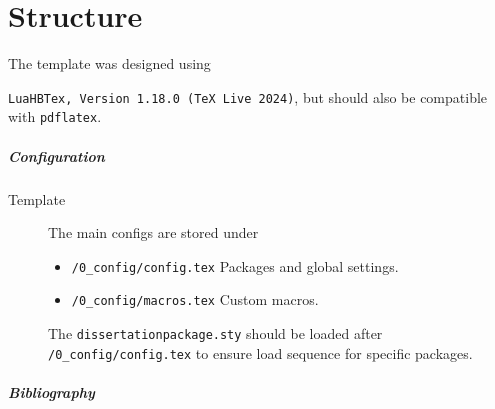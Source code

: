 

\cleardoublepage
\chapter{Structure}

The template was designed using 

\lstinline{LuaHBTex, Version 1.18.0 (TeX Live 2024)}, but should also be compatible with \lstinline{pdflatex}. 


\paragraph{Configuration}

\begin{description}
	\item[Template] The main configs are stored under 
	\begin{itemize}
	 	\item \lstinline{/0_config/config.tex} Packages and global settings.
	 	\item \lstinline{/0_config/macros.tex} Custom macros.
	 \end{itemize} 
	 The \lstinline{dissertationpackage.sty} should be loaded after \lstinline{/0_config/config.tex} to ensure load sequence for specific packages. 
\end{description}





\paragraph{Bibliography}

